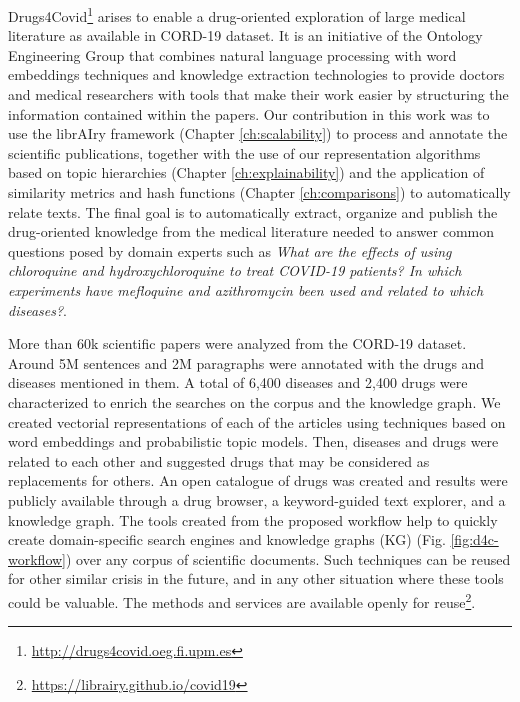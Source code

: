 Drugs4Covid\footnote{\url{http://drugs4covid.oeg.fi.upm.es}}\citep{badenesolmedo2020drugs4covid} arises to enable a drug-oriented exploration of large medical literature as available in CORD-19 dataset. It is an initiative of the Ontology Engineering Group that combines natural language processing with word embeddings techniques and knowledge extraction technologies to provide doctors and medical researchers with tools that make their work easier by structuring the information contained within the papers. Our contribution in this work was to use the librAIry framework (Chapter \ref{ch:scalability}) to process and annotate the scientific publications, together with the use of our representation algorithms based on topic hierarchies (Chapter \ref{ch:explainability}) and the application of similarity metrics and hash functions (Chapter \ref{ch:comparisons}) to automatically relate texts. The final goal is to automatically extract, organize and publish the drug-oriented knowledge from the medical literature needed to answer common questions posed by domain experts such as \textit{What are the effects of using chloroquine and hydroxychloroquine to treat COVID-19 patients? In which experiments have mefloquine and azithromycin been used and related to which diseases?}.  

More than 60k scientific papers were analyzed from the CORD-19 dataset. Around 5M sentences and 2M paragraphs were annotated with the drugs and diseases mentioned in them. A total of 6,400 diseases and 2,400 drugs were characterized to enrich the searches on the corpus and the knowledge graph. We created vectorial representations of each of the articles using techniques based on word embeddings and probabilistic topic models. Then, diseases and drugs were related to each other and suggested drugs that may be considered as replacements for others. An open catalogue of drugs was created and results were publicly available through a drug browser, a keyword-guided text explorer, and a knowledge graph. The tools created from the proposed workflow help to quickly create domain-specific search engines and knowledge graphs (KG) (Fig. \ref{fig:d4c-workflow}) over any corpus of scientific documents. Such techniques can be reused for other similar crisis in the future, and in any other situation where these tools could be valuable. The methods and services are available openly for reuse\footnote{\url{https://librairy.github.io/covid19}}. 









